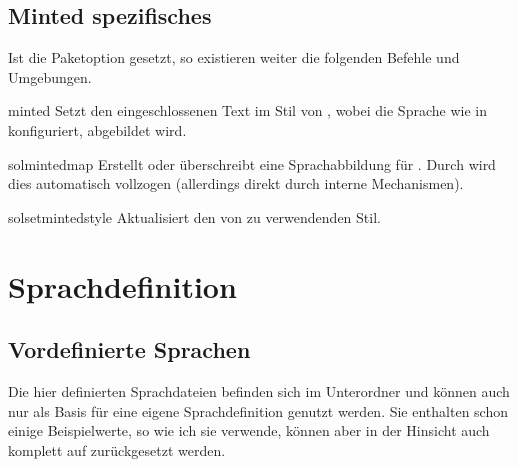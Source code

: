 \documentclass{sopra-base}
\begin{document}
\subsection{Minted spezifisches}

Ist die Paketoption  gesetzt, so existieren weiter die folgenden Befehle und Umgebungen.

\begin{environment}{minted}{}
    Setzt den eingeschlossenen Text im Stil von , wobei die Sprache wie in  konfiguriert, abgebildet wird.
\end{environment}

\begin{command}{solmintedmap}{}
    Erstellt oder überschreibt eine Sprachabbildung für .
    Durch  wird dies automatisch vollzogen (allerdings direkt durch interne Mechanismen).
\end{command}

\begin{command}{solsetmintedstyle}{}
    Aktualisiert den von  zu verwendenden Stil.
\end{command}

\clearpage
\appendix
\section{Sprachdefinition}

\subsection{Vordefinierte Sprachen}
\label{sec:vordefinierteSprachen}

Die hier definierten Sprachdateien befinden sich im Unterordner  und können auch nur als Basis für eine eigene Sprachdefinition genutzt werden. Sie enthalten schon einige Beispielwerte, so wie ich sie verwende, können aber in der Hinsicht auch komplett
auf  zurückgesetzt werden. 
\end{document}
